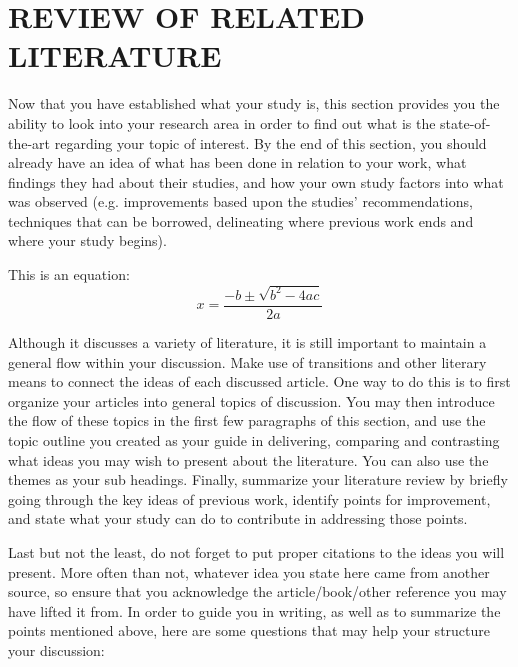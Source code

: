 \chapter{REVIEW OF RELATED LITERATURE}

Now that you have established what your study is, this section provides you the ability to look into your research area in order to find out what is the state-of-the-art regarding your topic of interest. By the end of this section, you should already have an idea of what has been done in relation to your work, what findings they had about their studies, and how your own study factors into what was observed (e.g. improvements based upon the studies’ recommendations, techniques that can be borrowed, delineating where previous work ends and where your study begins).

This is an equation:
\[
    x = \frac{-b \pm \sqrt{b^2 - 4ac}}{2a}
\]

Although it discusses a variety of literature, it is still important to maintain a general flow within your discussion. Make use of transitions and other literary means to connect the ideas of each discussed article. One way to do this is to first organize your articles into general topics of discussion. You may then introduce the flow of these topics in the first few paragraphs of this section, and use the topic outline you created as your guide in delivering, comparing and contrasting what ideas you may wish to present about the literature. You can also use the themes as your sub headings. Finally, summarize your literature review by briefly going through the key ideas of previous work, identify points for improvement, and state what your study can do to contribute in addressing those points.

Last but not the least, do not forget to put proper citations to the ideas you will present. More often than not, whatever idea you state here came from another source, so ensure that you acknowledge the article/book/other reference you may have lifted it from.
In order to guide you in writing, as well as to summarize the points mentioned above, here are some questions that may help your structure your discussion:

